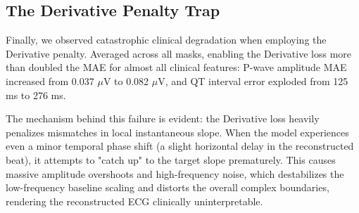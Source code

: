 \subsection{The Derivative Penalty Trap}
Finally, we observed catastrophic clinical degradation when employing the Derivative penalty. Averaged across all masks, enabling the Derivative loss more than doubled the MAE for almost all clinical features: P-wave amplitude MAE increased from 0.037 $\mu$V to 0.082 $\mu$V, and QT interval error exploded from 125 ms to 276 ms.

The mechanism behind this failure is evident: the Derivative loss heavily penalizes mismatches in local instantaneous slope. When the model experiences even a minor temporal phase shift (a slight horizontal delay in the reconstructed beat), it attempts to "catch up" to the target slope prematurely. This causes massive amplitude overshoots and high-frequency noise, which destabilizes the low-frequency baseline scaling and distorts the overall complex boundaries, rendering the reconstructed ECG clinically uninterpretable.
